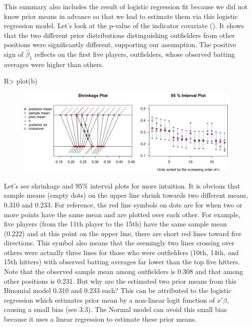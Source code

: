 \documentclass[article]{jss}
\begin{document}
This summary also includes the result of logistic regression fit because we did not know prior means in advance so that we had to estimate them via this logistic regression model. Let's look at the p-value of the indicator covariate (). It shows that the two different prior distributions distinguishing outfielders from other positions were significantly different, supporting our assumption. The positive sign of $\hat{\beta}_{1}$ reflects on the first five players, outfielders, whose observed batting averages were higher than others.
\\
\begin{CodeChunk}
\begin{CodeInput}
R> plot(b)
\end{CodeInput}
\end{CodeChunk}
\begin{figure}[h]
\begin{center}
\includegraphics[scale=0.3]{baseball1.png}
\end{center}
\end{figure}

Let's see shrinkage and 95\% interval plots for more intuition. It is obvious that sample means (empty dots) on the upper line shrink towards two different means, 0.310 and 0.233. For reference, the red line symbols on dots are for when two or more points have the same mean and are plotted over each other. For example, five players (from the 11th player to the 15th) have the same sample mean (0.222) and at this point on the upper line, there are short red lines toward five directions. This symbol also means that the seemingly two lines crossing over others were actually three lines for those who were outfielders (10th, 14th, and 15th hitters) with observed batting averages far lower than the top five hitters.
\\

Note that the observed sample mean among outfielders is 0.308 and that among other positions is 0.231. But why are the estimated two prior means from this Binomial model 0.310 and 0.233 each? This can be attributed to the logistic regression which estimates prior mean by a non-linear logit function of $x'\beta$, causing a small bias (see 3.3). The Normal model can avoid this small bias because it uses a linear regression to estimate these prior means.
\\
\end{document}
